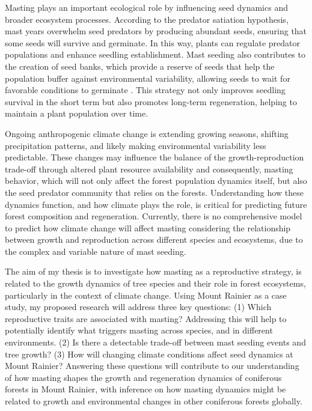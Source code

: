 \documentclass[11pt,letter]{article}
\begin{document}
Masting plays an important ecological role by influencing seed dynamics and broader ecosystem processes. According to the predator satiation hypothesis, mast years overwhelm seed predators by producing abundant seeds, ensuring that some seeds will survive and germinate. In this way, plants can regulate predator populations and enhance seedling establishment. Mast seeding also contributes to the creation of seed banks, which provide a reserve of seeds that help the population buffer against environmental variability, allowing seeds to wait for favorable conditions to germinate \citep{venable1989modeling}. This strategy not only improves seedling survival in the short term but also promotes long-term regeneration, helping to maintain a plant population over time.\par

Ongoing anthropogenic climate change is extending growing seasons, shifting precipitation patterns, and likely making environmental variability less predictable. These changes may influence the balance of the growth-reproduction trade-off through altered plant resource availability and consequently, masting behavior, which will not only affect the forest population dynamics itself, but also the seed predator community that relies on the forests. Understanding how these dynamics function, and how climate plays the role, is critical for predicting future forest composition and regeneration. Currently, there is no comprehensive model to predict how climate change will affect masting considering the relationship between growth and reproduction across different species and ecosystems, due to the complex and variable nature of mast seeding.\par

The aim of my thesis is to investigate how masting as a reproductive strategy, is related to the growth dynamics of tree species and their role in forest ecosystems, particularly in the context of climate change. Using Mount Rainier as a case study, my proposed research will address three key questions: (1) Which reproductive traits are associated with masting? Addressing this will help to potentially identify what triggers masting across species, and in different environments. (2) Is there a detectable trade-off between mast seeding events and tree growth? (3) How will changing climate conditions affect seed dynamics at Mount Rainier? Answering these questions will contribute to our understanding of how masting shapes the growth and regeneration dynamics of coniferous forests in Mount Rainier, with inference on how masting dynamics might be related to growth and environmental changes in other coniferous forests globally.\par
\end{document}

